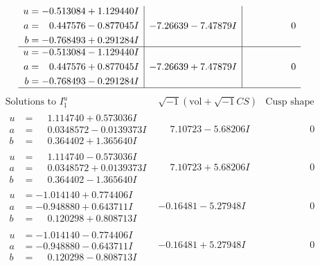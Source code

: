 \documentclass[1p]{elsarticle_modified}
\theoremstyle{definition}
\newcommand{\I}{\sqrt{-1}}
\begin{document}
$$\begin{array}{c|c|c}
\begin{aligned}
u &= -0.513084 + 1.129440 I \\
a &= \phantom{-}0.447576 - 0.877045 I \\
b &= -0.768493 + 0.291284 I\end{aligned}
 & -7.26639 - 7.47879 I & \phantom{-0.000000 } 0 \\ \hline\begin{aligned}
u &= -0.513084 - 1.129440 I \\
a &= \phantom{-}0.447576 + 0.877045 I \\
b &= -0.768493 - 0.291284 I\end{aligned}
 & -7.26639 + 7.47879 I & \phantom{-0.000000 } 0\\
 \hline 
 \end{array}$$\newpage$$\begin{array}{c|c|c}  
\text{Solutions to }I^u_{1}& \I (\text{vol} + \sqrt{-1}CS) & \text{Cusp shape}\\
 \hline 
\begin{aligned}
u &= \phantom{-}1.114740 + 0.573036 I \\
a &= \phantom{-}0.0348572 - 0.0139373 I \\
b &= \phantom{-}0.364402 + 1.365640 I\end{aligned}
 & \phantom{-}7.10723 - 5.68206 I & \phantom{-0.000000 } 0 \\ \hline\begin{aligned}
u &= \phantom{-}1.114740 - 0.573036 I \\
a &= \phantom{-}0.0348572 + 0.0139373 I \\
b &= \phantom{-}0.364402 - 1.365640 I\end{aligned}
 & \phantom{-}7.10723 + 5.68206 I & \phantom{-0.000000 } 0 \\ \hline\begin{aligned}
u &= -1.014140 + 0.774406 I \\
a &= -0.948880 + 0.643711 I \\
b &= \phantom{-}0.120298 + 0.808713 I\end{aligned}
 & -0.16481 - 5.27948 I & \phantom{-0.000000 } 0 \\ \hline\begin{aligned}
u &= -1.014140 - 0.774406 I \\
a &= -0.948880 - 0.643711 I \\
b &= \phantom{-}0.120298 - 0.808713 I\end{aligned}
 & -0.16481 + 5.27948 I & \phantom{-0.000000 } 0 \\ \hline\begin{aligned}

\end{aligned}
\end{array}$$
\end{document}
